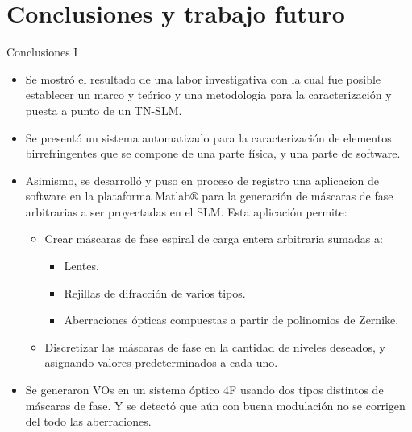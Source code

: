 \documentclass[xcolor=table,serif]{beamer}
\begin{document}
\section{Conclusiones y trabajo futuro}	
\begin{frame}{Conclusiones I}
\small
\begin{itemize}
  \item Se mostró el resultado de una labor investigativa con la cual
    fue posible establecer un marco y teórico y una metodología para la
    caracterización y puesta a punto de un TN-SLM. 
 \pause
 \item  Se presentó un sistema automatizado para la caracterización de 
   elementos birrefringentes que se compone de una parte física, y una parte de
    software. 
 \pause
 \item  Asimismo, se desarrolló y puso en proceso de registro una aplicacion de software en la
    plataforma Matlab$\circledR$ para la
    generación de máscaras de fase arbitrarias a ser proyectadas en el
    SLM. Esta aplicación permite:
    \begin{itemize}
      \item Crear máscaras de fase espiral de carga entera arbitraria
        sumadas a:
        \begin{itemize}
          \item Lentes.
          \item Rejillas de difracción de varios tipos.
          \item Aberraciones ópticas compuestas a partir de polinomios
            de Zernike.
        \end{itemize}
      \item Discretizar las máscaras de fase en la cantidad de niveles
        deseados, y asignando valores predeterminados a cada uno. 
\end{itemize}
\pause
\item  Se generaron VOs en un sistema óptico 4F usando dos tipos distintos de
   máscaras de fase. Y se detectó que aún con buena modulación no se
   corrigen del todo las aberraciones.  
\pause
\end{itemize}
\end{frame}
\end{document}
